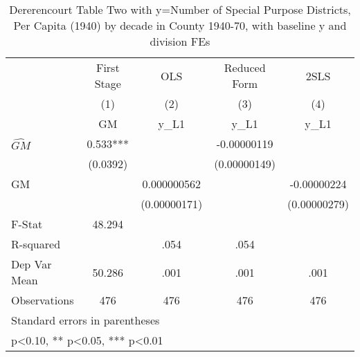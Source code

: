 \begin{table}[htbp]\centering
\def\sym#1{\ifmmode^{#1}\else\(^{#1}\)\fi}
\caption{Dererencourt Table Two with y=Number of Special Purpose Districts, Per Capita (1940) by decade in County 1940-70, with baseline y and division FEs}
\begin{tabular}{l*{4}{c}}
\toprule
                    & First Stage   &         OLS   &Reduced Form   &        2SLS   \\
                    &\multicolumn{1}{c}{(1)}&\multicolumn{1}{c}{(2)}&\multicolumn{1}{c}{(3)}&\multicolumn{1}{c}{(4)}\\
                    &\multicolumn{1}{c}{GM}&\multicolumn{1}{c}{y\_L1}&\multicolumn{1}{c}{y\_L1}&\multicolumn{1}{c}{y\_L1}\\
\midrule
$\hat{GM}$          &       0.533***&               & -0.00000119   &               \\
                    &    (0.0392)   &               &(0.00000149)   &               \\
\addlinespace
GM                  &               & 0.000000562   &               & -0.00000224   \\
                    &               &(0.00000171)   &               &(0.00000279)   \\
\midrule
F-Stat              &      48.294   &               &               &               \\
R-squared           &               &        .054   &        .054   &               \\
Dep Var Mean        &      50.286   &        .001   &        .001   &        .001   \\
Observations        &         476   &         476   &         476   &         476   \\
\bottomrule
\multicolumn{5}{l}{\footnotesize Standard errors in parentheses}\\
\multicolumn{5}{l}{\footnotesize * p<0.10, ** p<0.05, *** p<0.01}\\
\end{tabular}
\end{table}
